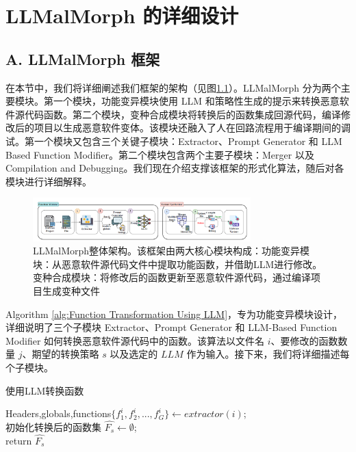 \chapter{LLMalMorph 的详细设计}

\section{A. LLMalMorph 框架}

在本节中，我们将详细阐述我们框架的架构（见图\ref{fig:4.1}）。LLMalMorph 分为两个主要模块。第一个模块，功能变异模块使用 LLM 和策略性生成的提示来转换恶意软件源代码函数。第二个模块，变种合成模块将转换后的函数集成回源代码，编译修改后的项目以生成恶意软件变体。该模块还融入了人在回路流程用于编译期间的调试。第一个模块又包含三个关键子模块：Extractor、Prompt Generator 和 LLM Based Function Modifier。第二个模块包含两个主要子模块：Merger 以及 Compilation and Debugging。我们现在介绍支撑该框架的形式化算法，随后对各模块进行详细解释。

\begin{figure}[htbp]
	\centering
	\includegraphics[width=0.75\textwidth]{figures/figure1.png}
	\caption{LLMalMorph整体架构。该框架由两大核心模块构成：功能变异模块：从恶意软件源代码文件中提取功能函数，并借助LLM进行修改。变种合成模块：将修改后的函数更新至恶意软件源代码，通过编译项目生成变种文件}\label{fig:4.1}
\end{figure}

Algorithm \ref{alg:Function Transformation Using LLM}，专为功能变异模块设计，详细说明了三个子模块 Extractor、Prompt Generator 和 LLM-Based Function Modifier 如何转换恶意软件源代码中的函数。该算法以文件名 $i$、要修改的函数数量 $j$、期望的转换策略 $s$ 以及选定的 $LLM$ 作为输入。接下来，我们将详细描述每个子模块。

\begin{algorithm}[htbp]
	\caption{使用LLM转换函数\label{alg:Function Transformation Using LLM}}

    Headers,globals,functions$\{f_{1}^{i},f_{2}^{i},...,f_{G}^{i}\}\leftarrow extractor(i)$;\\
    初始化转换后的函数集 $\hat{F_{s}}\leftarrow \emptyset$;\\

    return $\hat{F_{s}}$
\end{algorithm}

